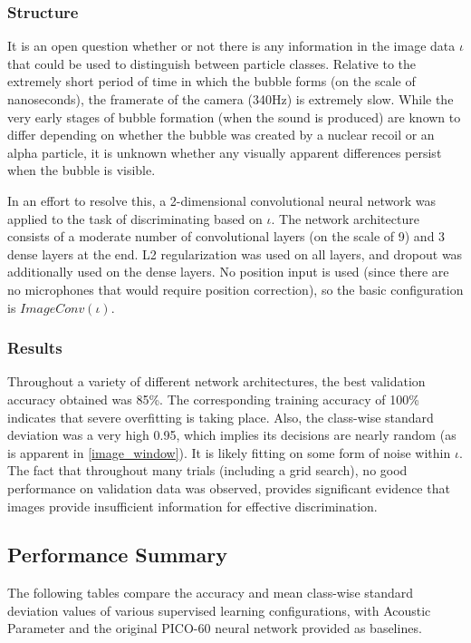\documentclass[10pt]{article}
\begin{document}
\subsubsection{Structure}

It is an open question whether or not there is any information in the image data $\iota$ that could be used to distinguish between particle classes. Relative to the extremely short period of time in which the bubble forms (on the scale of nanoseconds), the framerate of the camera (340Hz) is extremely slow. While the very early stages of bubble formation (when the sound is produced) are known to differ depending on whether the bubble was created by a nuclear recoil or an alpha particle, it is unknown whether any visually apparent differences persist when the bubble is visible.

In an effort to resolve this, a 2-dimensional convolutional neural network was applied to the task of discriminating based on $\iota$. The network architecture consists of a moderate number of convolutional layers (on the scale of 9) and 3 dense layers at the end. L2 regularization was used on all layers, and dropout was additionally used on the dense layers. No position input is used (since there are no microphones that would require position correction), so the basic configuration is $ImageConv(\iota)$.

\subsubsection{Results}

Throughout a variety of different network architectures, the best validation accuracy obtained was 85\%. The corresponding training accuracy of 100\% indicates that severe overfitting is taking place. Also, the class-wise standard deviation was a very high 0.95, which implies its decisions are nearly random (as is apparent in \ref{image_window}). It is likely fitting on some form of noise within $\iota$. The fact that throughout many trials (including a grid search), no good performance on validation data was observed, provides significant evidence that images provide insufficient information for effective discrimination.

\subsection{Performance Summary}

The following tables compare the accuracy and mean class-wise standard deviation values of various supervised learning configurations, with Acoustic Parameter and the original PICO-60 neural network provided as baselines.
\end{document}
